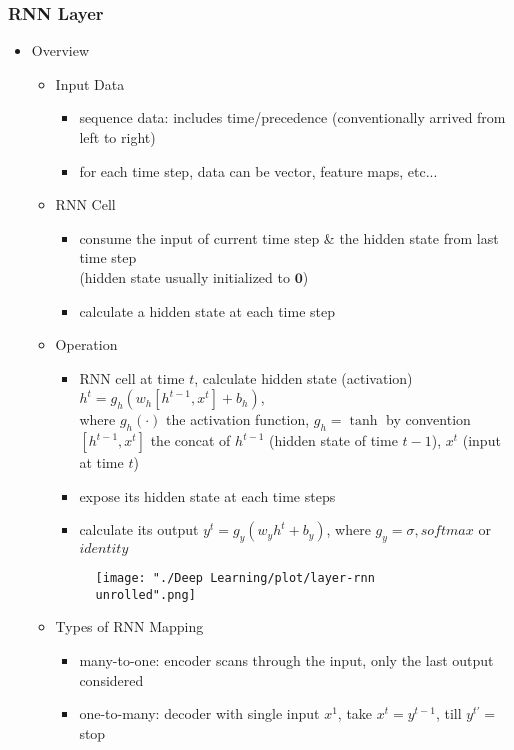 \subsubsection{RNN Layer}
\begin{itemize}
\item Overview
	\begin{itemize}
	\item Input Data
		\begin{itemize}
		\item sequence data: includes time/precedence (conventionally arrived from left to right)
		\item for each time step, data can be vector, feature maps, etc...
		\end{itemize}
	\item RNN Cell
		\begin{itemize}
		\item consume the input of current time step \& the hidden state from last time step \\
		(hidden state usually initialized to $\mathbf 0$)
		\item calculate a hidden state at each time step
		\end{itemize}
	\item Operation
		\begin{itemize}
		\item RNN cell at time $t$, calculate hidden state (activation) $h^t = g_h(w_{h}[h^{t-1},x^t] + b_h)$, \\ 
		where $g_h(\cdot)$ the activation function, $g_h=\tanh$ by convention \\
		$[h^{t-1}, x^t]$ the concat of $h^{t-1}$ (hidden state of time $t-1$), $x^t$ (input at time $t$)
		\item expose its hidden state at each time steps
		\item calculate its output $y^t=g_y(w_{y}h^t+b_y)$, where $g_y=\sigma, softmax$ or $identity$
		\end{itemize}
		\begin{figure}[ht]
		\texttt{[image: "./Deep Learning/plot/layer-rnn unrolled".png]}
		\end{figure}
	\item Types of RNN Mapping
		\begin{itemize}
		\item many-to-one: encoder scans through the input, only the last output considered
		\item one-to-many: decoder with single input $x^1$, take $x^t=y^{t-1}$, till $y^{t'}=$ stop

\end{itemize}
\end{itemize}
\end{itemize}
